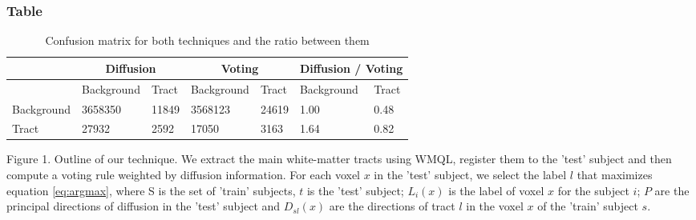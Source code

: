 \subsubsection*{Table}

\begin{table}[]
\centering
\caption{Confusion matrix for both techniques and the ratio between them}
\label{my-label}
\begin{tabular}{|l||l|l||l|l||l|l|}
\hline
      & \multicolumn{2}{c||}{Diffusion} & \multicolumn{2}{c||}{Voting} &  \multicolumn{2}{|c|}{Diffusion / Voting} \\ 
      \hline
            & Background  & Tract & Background  & Tract     & Background  & Tract \\
      \hline
Background  & 3658350     & 11849 & 3568123     & 24619     & 1.00        & 0.48   \\
      \hline
Tract       & 27932       & 2592  & 17050       & 3163      & 1.64        & 0.82   \\
\hline
\end{tabular}
\end{table}

Figure 1. Outline of our technique. We extract the main white-matter tracts using WMQL, register them to the 'test' subject and then compute a voting rule weighted by diffusion information. For each voxel $x$ in the 'test' subject, we select the label $l$ that maximizes equation \ref{eq:argmax}, where S is the set of 'train' subjects, $t$ is the 'test' subject; $L_i(x)$ is the label of voxel $x$ for the subject $i$; $P$ are the principal directions of diffusion in the 'test' subject and $D_{sl}(x)$ are the directions of tract $l$ in the voxel $x$ of the 'train' subject $s$.
